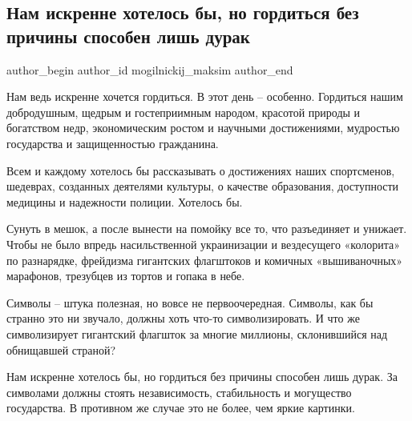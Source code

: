  
 
 
 
 
 
\subsection{Нам искренне хотелось бы, но гордиться без причины способен лишь дурак}
\label{sec:24_08_2021.fb.mogilnickij_maksim.1.gordost_nezavisimost}
 
\ifcmt
 author_begin
   author_id mogilnickij_maksim
 author_end
\fi

Нам ведь искренне хочется гордиться. В этот день – особенно. Гордиться нашим
добродушным, щедрым и гостеприимным народом, красотой природы и богатством
недр, экономическим ростом и научными достижениями, мудростью государства и
защищенностью гражданина.

Всем и каждому хотелось бы рассказывать о достижениях наших спортсменов,
шедеврах, созданных деятелями культуры, о качестве образования, доступности
медицины и надежности полиции. Хотелось бы.

Сунуть в мешок, а после вынести на помойку все то, что разъединяет и унижает.
Чтобы не было впредь насильственной украинизации и вездесущего «колорита» по
разнарядке, фрейдизма гигантских флагштоков и комичных «вышиваночных»
марафонов, трезубцев из тортов и гопака в небе.

Символы – штука полезная, но вовсе не первоочередная. Символы, как бы странно
это ни звучало, должны хоть что-то символизировать. И что же символизирует
гигантский флагшток за многие миллионы, склонившийся над обнищавшей страной?

Нам искренне хотелось бы, но гордиться без причины способен лишь дурак. За
символами должны стоять независимость, стабильность и могущество государства. В
противном же случае это не более, чем яркие картинки.
